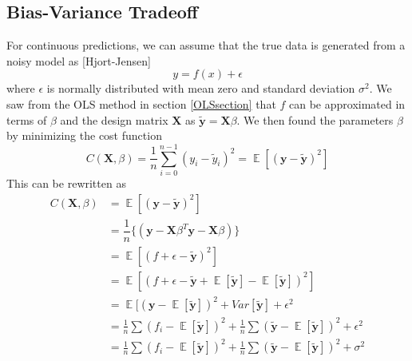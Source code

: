 \documentclass{article}
\DeclareMathOperator{\EX}{\mathbb{E}}
\begin{document}
\subsection{Bias-Variance Tradeoff}
For continuous predictions, we can assume that the true data is generated from a noisy model as [Hjort-Jensen]
\begin{equation}
y = f(x) + \epsilon
\end{equation}
where $\epsilon$ is normally distributed with mean zero and standard deviation $\sigma^{2}$. We saw from the OLS method in section \ref{OLSsection} that $f$ can be approximated in terms of $\beta$ and the design matrix $\textbf{X}$ as $\tilde{\textbf{y}} = \textbf{X} \beta$. We then found the parameters $\beta$ by minimizing the cost function
\begin{equation}\label{biastradeoff}
C(\textbf{X},\beta) = \frac{1}{n} \sum_{i=0}^{n-1} (y_{i} - \tilde{y}_{i})^{2} = \EX [(\textbf{y} - \widetilde{\textbf{y}})^{2}]
\end{equation}
This can be rewritten as
\begin{align*}\label{biastradeoff}
C(\textbf{X},\beta) &= \EX [(\textbf{y} - \widetilde{\textbf{y}})^{2}]\\
&= \dfrac{1}{n} \{( \textbf{y}-\textbf{X}\beta^{T}\textbf{y}-\textbf{X}\beta)\} \\
&= \EX [(f + \epsilon - \tilde{\textbf{y}})^{2}] \\
&= \EX [(f + \epsilon - \tilde{\textbf{y}} + \EX[\tilde{\textbf{y}}] - \EX[\tilde{\textbf{y}}])^{2}]\\
&= \EX [(\textbf{y} - \EX [\tilde{\textbf{y}}])^{2} + Var[\tilde{\textbf{y}}] + \epsilon^{2} \\
&= \frac{1}{n} \sum (f_{i} - \EX[\tilde{\textbf{y}}])^{2} + \frac{1}{n} \sum (\tilde{\textbf{y}} - \EX[\tilde{\textbf{y}}])^{2} + \epsilon^{2} \\
&= \frac{1}{n} \sum (f_{i} - \EX[\tilde{\textbf{y}}])^{2} + \frac{1}{n} \sum (\tilde{\textbf{y}} - \EX[\tilde{\textbf{y}}])^{2} + \sigma^{2}
\end{align*}
\end{document}
